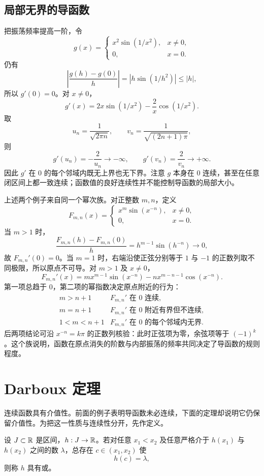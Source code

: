 \subsection{局部无界的导函数}

把振荡频率提高一阶，令
\[
 g(x)=
 \begin{cases}
  x^2\sin(1/x^2),&x\ne0,\\
  0,&x=0.
 \end{cases}
\]
仍有
\[
 \left|\frac{g(h)-g(0)}h\right|
 =|h\sin(1/h^2)|\le |h|,
\]
所以 \(g'(0)=0\)。对 \(x\ne0\)，
\[
 g'(x)=2x\sin(1/x^2)-\frac2x\cos(1/x^2).
\]
取
\[
 u_n=\frac1{\sqrt{2\pi n}},
 \qquad
 v_n=\frac1{\sqrt{(2n+1)\pi}},
\]
则
\[
 g'(u_n)=-\frac2{u_n}\longrightarrow-\infty,
 \qquad
 g'(v_n)=\frac2{v_n}\longrightarrow+\infty.
\]
因此 \(g'\) 在 \(0\) 的每个邻域内既无上界也无下界。注意 \(g\) 本身在 \(0\) 连续，甚至在任意闭区间上都一致连续；函数值的良好连续性并不能控制导函数的局部大小。

上述两个例子来自同一个幂次族。对正整数 \(m,n\)，定义
\[
 F_{m,n}(x)=
 \begin{cases}
  x^m\sin(x^{-n}),&x\ne0,\\
  0,&x=0.
 \end{cases}
\]
当 \(m>1\) 时，
\[
 \frac{F_{m,n}(h)-F_{m,n}(0)}h
 =h^{m-1}\sin(h^{-n})\longrightarrow0,
\]
故 \(F_{m,n}'(0)=0\)。当 \(m=1\) 时，右端沿使正弦分别等于 \(1\) 与 \(-1\) 的正数列取不同极限，所以原点不可导。对 \(m>1\) 及 \(x\ne0\)，
\[
 F_{m,n}'(x)
 =m x^{m-1}\sin(x^{-n})
 -n x^{m-n-1}\cos(x^{-n}).
\]
第一项总趋于 \(0\)，第二项的幂指数决定原点附近的行为：
\[
 \begin{array}{c|c}
  m>n+1 & F_{m,n}'\text{ 在 }0\text{ 连续},\\
  m=n+1 & F_{m,n}'\text{ 在 }0\text{ 附近有界但不连续},\\
  1<m<n+1 & F_{m,n}'\text{ 在 }0\text{ 的每个邻域内无界}.
 \end{array}
\]
后两项结论可沿 \(x^{-n}=k\pi\) 的正数列核验：此时正弦项为零，余弦项等于 \((-1)^k\)。这个族说明，函数在原点消失的阶数与内部振荡的频率共同决定了导函数的规则程度。

\section{Darboux 定理}

连续函数具有介值性。前面的例子表明导函数未必连续，下面的定理却说明它仍保留介值性。为把这一性质与连续性分开，先作定义。

\begin{definition}[Darboux 性质]
设 \(J\subset\mathbb{R}\) 是区间，\(h:J\to\mathbb{R}\)。若对任意 \(x_1<x_2\) 及任意严格介于 \(h(x_1)\) 与 \(h(x_2)\) 之间的数 \(\lambda\)，总存在 \(c\in(x_1,x_2)\) 使
\[
 h(c)=\lambda,
\]
则称 \(h\) 具有或。
\end{definition}

